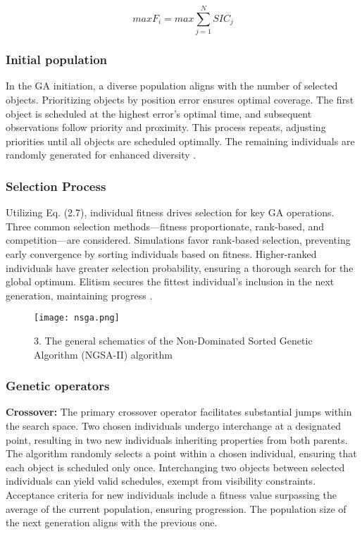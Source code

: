 \begin{equation}
	max F_i= max \sum_{j=1}^{N} SIC_j
\end{equation}

\subsubsection{Initial population}

In the GA initiation, a diverse population aligns with the number of selected objects. Prioritizing objects by position error ensures optimal coverage. The first object is scheduled at the highest error's optimal time, and subsequent observations follow priority and proximity. This process repeats, adjusting priorities until all objects are scheduled optimally. The remaining individuals are randomly generated for enhanced diversity \cite{hinze1}.\\

\subsubsection{Selection Process}

Utilizing Eq. (2.7), individual fitness drives selection for key GA operations. Three common selection methods—fitness proportionate, rank-based, and competition—are considered. Simulations favor rank-based selection, preventing early convergence by sorting individuals based on fitness. Higher-ranked individuals have greater selection probability, ensuring a thorough search for the global optimum. Elitism secures the fittest individual's inclusion in the next generation, maintaining progress \cite{hinze1}.\\

\begin{figure}[h!]
	\centering
	\texttt{[image: nsga.png]}
	\caption{3. The general schematics of the Non-Dominated Sorted Genetic Algorithm (NGSA-II) algorithm \cite{nsga}}\label{fig:nsg}
\end{figure}


\subsubsection{Genetic operators}

\textbf{Crossover:} The primary crossover operator facilitates substantial jumps within the search space. Two chosen individuals undergo interchange at a designated point, resulting in two new individuals inheriting properties from both parents. The algorithm randomly selects a point within a chosen individual, ensuring that each object is scheduled only once. Interchanging two objects between selected individuals can yield valid schedules, exempt from visibility constraints. Acceptance criteria for new individuals include a fitness value surpassing the average of the current population, ensuring progression. The population size of the next generation aligns with the previous one\cite{hinze1}.\\

